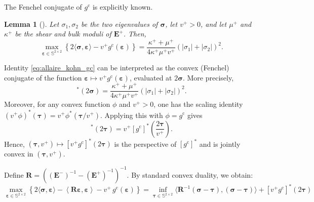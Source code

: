 \documentclass[preprint,3p]{elsarticle}
\newcommand{\tenss}[1]{\bm{\mathbf{#1}}}            %
\newcommand{\tensf}[1]{\bm{\mathbf{#1}}}            %
\newcommand{\strain}{\tenss{\varepsilon}}           %
\newcommand{\stress}{\tenss{\sigma}}                %
\newcommand{\Emin}{\tensf{E}^{-}}                   %
\newcommand{\Emax}{\tensf{E}^{+}}                   %
\newtheorem{lemma}{Lemma}[section]
\begin{document}
The Fenchel conjugate of $g^\mathrm{c}$ is explicitly known.
%
\begin{lemma}[{\citep{Allaire1993od}}]
    Let $\sigma_1,\sigma_2$ be the two eigenvalues of $\stress$, let $v^+>0$, and let $\mu^+$ and $\kappa^+$ be the shear and bulk moduli of $\tensf{E}^+$. Then,
    \begin{equation}\label{eq:allaire_kohn_gc}
        \max_{\strain\in\mathbb{S}^{2\times 2}}\left\{2\langle\stress,\strain\rangle-v^+ g^\mathrm{c}(\strain)\right\}=\frac{\kappa^++\mu^+}{4\kappa^+\mu^+v^+}(\lvert\sigma_1\rvert+\lvert\sigma_2\rvert)^2.
    \end{equation}
\end{lemma}

Identity \eqref{eq:allaire_kohn_gc} can be interpreted as the convex (Fenchel) conjugate of the function $\strain\mapsto v^+ g^\mathrm{c}(\strain)$, evaluated at $2\stress$. More precisely,
%
\begin{equation}
    [v^+ g^\mathrm{c}]^*(2\stress)=\frac{\kappa^++\mu^+}{4\kappa^+\mu^+v^+}(\lvert\sigma_1\rvert+\lvert\sigma_2\rvert)^2.
\end{equation}
%
Moreover, for any convex function $\phi$ and $v^+>0$, one has the scaling identity $(v^+\phi)^*(\tenss{\tau})=v^+\phi^*(\tenss{\tau}/v^+)$. Applying this with $\phi=g^\mathrm{c}$ gives
%
\begin{equation}
[v^+ g^\mathrm{c}]^*(2\tenss{\tau})=v^+[g^\mathrm{c}]^*\!\left(\frac{2\tenss{\tau}}{v^+}\right).
\end{equation}
%
Hence, $(\tenss{\tau},v^+)\mapsto [v^+ g^\mathrm{c}]^*(2\tenss{\tau})$ is the perspective of $[g^\mathrm{c}]^*$ and is jointly convex in $(\tenss{\tau},v^+)$.

Define $\tensf{R}=\left((\Emin)^{-1}-(\Emax)^{-1}\right)^{-1}$. By standard convex duality, we obtain:
%
\begin{equation}
    \max_{\strain\in\mathbb{S}^{2\times 2}}
\left\{ 2\langle\stress,\strain\rangle
 - \left\langle\tensf{R}\strain,\strain\right\rangle
 - v^+\, g^{\mathrm{c}}(\strain)\right\}
    = \inf_{\tenss{\tau}\in\mathbb{S}^{2\times 2}}\langle\tensf{R}^{-1}(\stress-\tenss{\tau}),(\stress-\tenss{\tau})\rangle+[v^+ g^\mathrm{c}]^*(2\tenss{\tau})
\end{equation}
\end{document}

